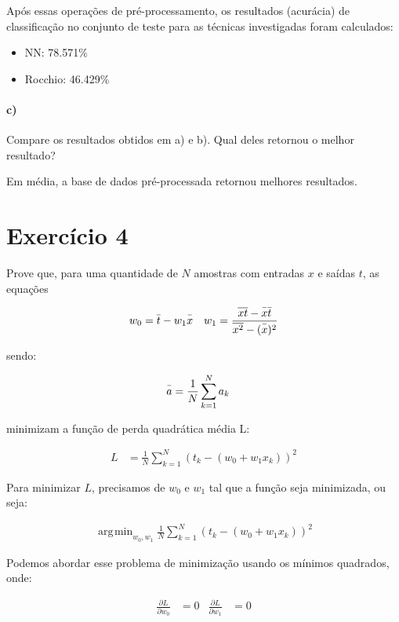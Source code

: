 \documentclass{article}
\DeclareMathOperator*{\argmin}{arg\!min}
\begin{document}
Após essas operações de pré-processamento, os resultados (acurácia) de classificação no conjunto de teste para as técnicas investigadas foram calculados:

\begin{itemize}
	\item NN: 78.571\%
	\item Rocchio: 46.429\%
\end{itemize}

\paragraph{c)} Compare os resultados obtidos em a) e b). Qual deles retornou o melhor resultado?

Em média, a base de dados pré-processada retornou melhores resultados.

\section{Exercício 4}

Prove que, para uma quantidade de $N$ amostras com entradas $x$ e saídas $t$, as equações

\begin{align*}
w_0 &= \bar{t\vphantom{+1}} - w_1\bar{x\vphantom{+1}} 
& 
w_1 = \frac{\overline{xt\vphantom{+1}}-\bar{x\vphantom{+1}}\bar{t\vphantom{+1}}}{\overline{x^2\vphantom{+1}}-(\bar{x\vphantom{+1}})^2}
\end{align*}

sendo:

\begin{align*}
\bar{a\vphantom{+1}} &= \frac{1}{N} \sum_{k=1}^{N}a_k
\end{align*}

minimizam a função de perda quadrática média L:

\begin{align*}
L &= \frac{1}{N} \sum_{k=1}^{N}(t_k - (w_0 + w_1x_k))^2
\end{align*}

Para minimizar $L$, precisamos de $w_0$ e $w_1$ tal que a função seja minimizada, ou seja:


\begin{align*}
\argmin_{w_0, w_1} \frac{1}{N} \sum_{k=1}^{N}(t_k - (w_0 + w_1x_k))^2
\end{align*}

Podemos abordar esse problema de minimização usando os mínimos quadrados, onde:

\begin{align*}
\frac{\partial L}{\partial w_0} &= 0
& 
\frac{\partial L}{\partial w_1} &= 0
\end{align*}
\end{document}
